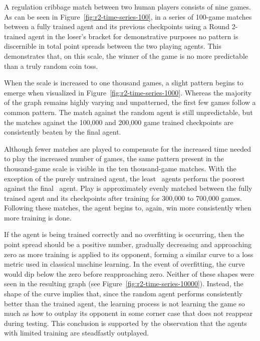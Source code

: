 A regulation cribbage match between two human players consists of nine games.
%
As can be seen in Figure~\ref{fig:r2-time-series-100},
in a series of 100-game matches between a fully trained agent and its
previous checkpoints\textemdash
using a Round 2-trained agent in the loser's bracket for demonstrative
purposes\textemdash
no pattern is discernible in total point spreads between the two playing agents.
%
This demonstrates that,
on this scale,
the winner of the game is no more predictable than a truly random coin toss.

When the scale is increased to one thousand games,
a slight pattern begins to emerge
when visualized in Figure~\ref{fig:r2-time-series-1000}.
%
Whereas the majority of the graph remains highly varying and unpatterned,
the first few games follow a common pattern.
%
The match against the random agent is still unpredictable,
but the matches against the 100,000 and 200,000 game trained checkpoints are
consistently beaten by the final agent.

Although fewer matches are played to compensate for the increased time needed to
play the increased number of games,
the same pattern present in the thousand-game scale is visible in the
ten thousand-game matches.
%
With the exception of the purely untrained agent,
the least \learned\ agents perform the poorest against the final
\learned\ agent.
%
Play is approximately evenly matched between the fully trained agent
and its checkpoints after training for 300,000 to 700,000 games.
%
Following these matches,
the agent begins to, again, win more consistently when more training is done.

If the agent is being trained correctly and no overfitting is occurring,
then the point spread should be a positive number,
gradually decreasing and approaching zero
as more training is applied to its opponent,
forming a similar curve to a loss metric used in classical machine learning.
%
In the event of overfitting,
the curve would dip below the zero before reapproaching zero.
%
Neither of these shapes were seen in the resulting graph
(see Figure~\ref{fig:r2-time-series-10000}).
%
Instead,
the shape of the curve implies that,
since the random agent performs consistently better than the trained agent,
the learning process is not learning the game so much as how to outplay its
opponent in some corner case that does not reappear during testing.
%
This conclusion is supported by the observation that the agents with limited
training are steadfastly outplayed.

